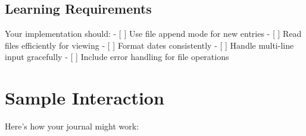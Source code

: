 \documentclass[
  letterpaper,
  DIV=11,
  numbers=noendperiod,
  oneside]{scrreprt}
\begin{document}
\subsection{Learning Requirements}\label{learning-requirements-6}

Your implementation should: - {[} {]} Use file append mode for new
entries - {[} {]} Read files efficiently for viewing - {[} {]} Format
dates consistently - {[} {]} Handle multi-line input gracefully - {[}
{]} Include error handling for file operations

\section{Sample Interaction}\label{sample-interaction-6}

Here's how your journal might work:
\end{document}
